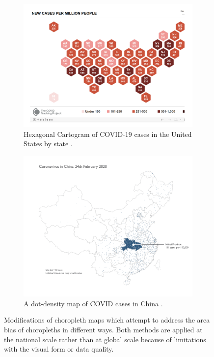 \documentclass[article]{jdssv}\usepackage[]{graphicx}\usepackage[]{color}
\begin{document}
\begin{figure}
\centering
\begin{subfigure}[c]{\textwidth}
\centering
\includegraphics[width=.65\textwidth]{COVID-tracking-hex-cartogram}
\caption{Hexagonal Cartogram of COVID-19 cases in the United States by state \citep{StateCases1M2021}.}\label{fig:hex-cartogram}
\end{subfigure}

\begin{subfigure}[c]{\textwidth}
\centering
\includegraphics[width=\textwidth]{china-dotmap}
\caption{A dot-density map of COVID cases in China \citep{fieldMappingCoronavirusResponsibly}.}\label{fig:china-dot-map}
\end{subfigure}
\caption{Modifications of choropleth maps which attempt to address the area bias of choropleths in different ways. Both methods are applied at the national scale rather than at global scale because of limitations with the visual form or data quality.}
\end{figure}
\end{document}
